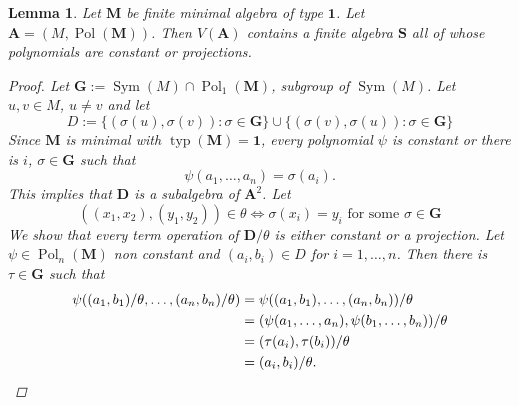 \documentclass{amsart}
\theoremstyle{plain}
\newtheorem{lemma}[theorem]{Lemma}
\theoremstyle{definition}
\theoremstyle{remark}
\DeclareMathOperator{\Pol}{Pol}
\DeclareMathOperator{\typ}{typ}
\DeclareMathOperator{\Sym}{Sym}
\begin{document}
\begin{lemma}
    \label{trivial_pol}
    Let $\mathbf{M}$ be finite minimal algebra of type $\mathbf{1}$. 
    Let $\mathbf{A}=(M, \Pol(\mathbf{M}))$.
    Then $V(\mathbf{A})$ contains a finite algebra $\mathbf{S}$ all of whose polynomials are constant or projections. 
    \begin{proof}
        Let $\mathbf{G}:=\Sym(M) \cap \Pol_1(\mathbf{M})$, subgroup of $\Sym(M)$. 
        Let $u,v \in M$, $u \neq v$ and let 
        \begin{equation*}
            D:=\{(\sigma(u), \sigma(v)) : \sigma \in \mathbf{G}\} \cup \{(\sigma(v), \sigma(u)) : \sigma \in \mathbf{G}\}
        \end{equation*}
        Since $\mathbf{M}$ is minimal with $\typ(\mathbf{M})=\mathbf{1}$, every polynomial $\psi$ is constant or there is $i$, $\sigma \in \mathbf{G}$ such that 
        \begin{equation*}
            \psi(a_1, \ldots, a_n) = \sigma(a_i) \text{.}
        \end{equation*}
        This implies that $\mathbf{D}$ is a subalgebra of $\mathbf{A}^2$. 
        Let 
        \begin{equation*}
            ((x_1, x_2), (y_1,y_2)) \in \theta \iff \sigma(x_i)=y_i \text{ for some } \sigma \in \mathbf{G}
        \end{equation*}
        We show that every term operation of $\mathbf{D}/\theta$ is either constant or a projection. 
        Let $\psi \in \Pol_n(\mathbf{M})$ non constant and $(a_i,b_i) \in D$ for $i=1, \ldots, n$. 
        Then there is $\tau \in \mathbf{G}$ such that 
        \begin{align*}
           \psi((a_1, b_1)/\theta, \ldots, (a_n, b_n)/\theta) & = \psi((a_1, b_1), \ldots, (a_n, b_n)) /\theta \\
           & = (\psi(a_1, \ldots, a_n), \psi(b_1,\ldots, b_n)) / \theta \\
           & = (\tau(a_i), \tau(b_i)) / \theta \\
           & = (a_i, b_i) / \theta \text{.} \qedhere \\
        \end{align*}
    \end{proof}
\end{lemma}
\end{document}
